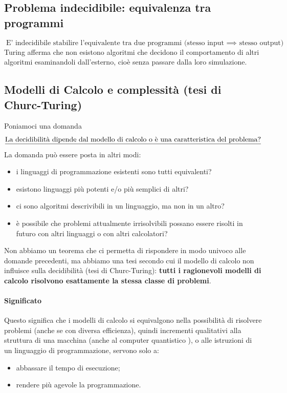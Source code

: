 \subsection{Problema indecidibile: equivalenza tra programmi}
\[\boxed{\text{E' indecidibile stabilire l'equivalente tra due programmi (stesso input $\implies$ stesso output)}}\]
Turing afferma che non esistono algoritmi che decidono il comportamento di altri algoritmi esaminandoli dall’esterno, cioè senza passare dalla loro simulazione.

\subsection{Modelli di Calcolo e complessità (tesi di Churc-Turing)}
Poniamoci una domanda
\[\text{\underline{La decidibilità dipende dal modello di calcolo o è una caratteristica del problema?}}\]
La domanda può essere posta in altri modi:
\begin{itemize}
	\item i linguaggi di programmazione esistenti sono tutti equivalenti? 
	\item esistono linguaggi più potenti e/o più semplici di altri? 
	\item ci sono algoritmi descrivibili in un linguaggio, ma non in un altro? 
	\item è possibile che problemi attualmente irrisolvibili possano essere risolti in futuro con altri linguaggi o con altri calcolatori?
\end{itemize}
Non abbiamo un teorema che ci permetta di rispondere in modo univoco alle domande precedenti, ma abbiamo una tesi secondo cui il modello di calcolo non influisce sulla decidibilità (tesi di Churc-Turing): \textbf{tutti i ragionevoli modelli di calcolo risolvono esattamente la stessa classe di problemi}. 
\paragraph{Significato} Questo significa che i modelli di calcolo si equivalgono nella possibilità di risolvere problemi (anche se con diversa efficienza), quindi incrementi qualitativi alla struttura di una macchina (anche al computer quantistico ), o alle istruzioni di un linguaggio di programmazione, servono solo a:
\begin{itemize}
	\item abbassare il tempo di esecuzione;
	\item rendere più agevole la programmazione.
\end{itemize}

